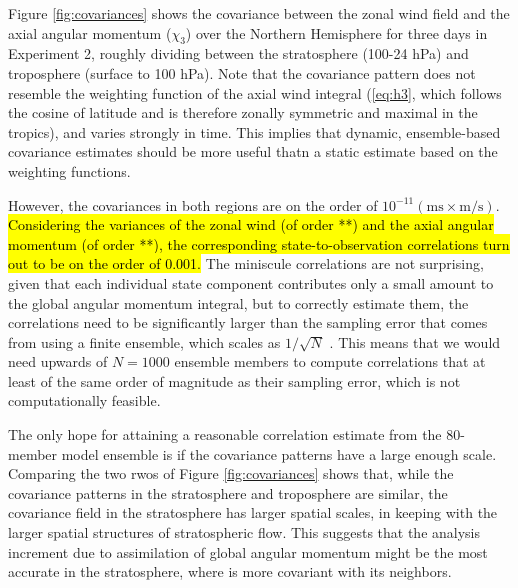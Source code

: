 Figure \ref{fig:covariances} shows the covariance between the zonal wind field and the axial angular momentum ($\chi_3$) over the Northern Hemisphere for three days in Experiment 2, roughly dividing between the 
stratosphere (100-24 hPa) 
and
troposphere (surface to 100 hPa).
Note that the covariance pattern does not resemble the weighting function of the axial wind integral (\ref{eq:h3}, which follows the cosine of latitude and is therefore zonally symmetric and maximal in the tropics), and varies strongly in time. 
This implies that dynamic, ensemble-based covariance estimates should be more useful thatn a static estimate based on the weighting functions.

However, the covariances in both regions are on the order of $10^{-11}(\text{ms} \times \text{m/s})$.  
\hl{Considering the variances of the zonal wind (of order **) and the axial angular momentum (of order **), the corresponding state-to-observation correlations turn out to be on the order of 0.001.} 
The miniscule correlations are not surprising, given that each individual state component contributes only a small amount to the global angular momentum integral, but to 
correctly estimate them, the correlations need to be significantly larger than the sampling error that comes from using a finite ensemble, which 
scales as $1/\sqrt{N}$ \citep{Houtekamer1998}. 
This means that we would need upwards of $N=1000$ ensemble members to compute correlations that at least of the same order of magnitude as their sampling error, which is not computationally feasible. 

The only hope for attaining a reasonable correlation estimate from the 80-member model ensemble is if the covariance patterns have a large enough scale.  
Comparing the two rwos of Figure \ref{fig:covariances} shows that, while
the covariance patterns in the stratosphere and troposphere are similar, the covariance field in the stratosphere has larger spatial scales, in keeping with the larger spatial structures of stratospheric flow.
This suggests that the analysis increment due to assimilation of global angular momentum might be the most accurate in the stratosphere, where is more covariant with its neighbors.  

